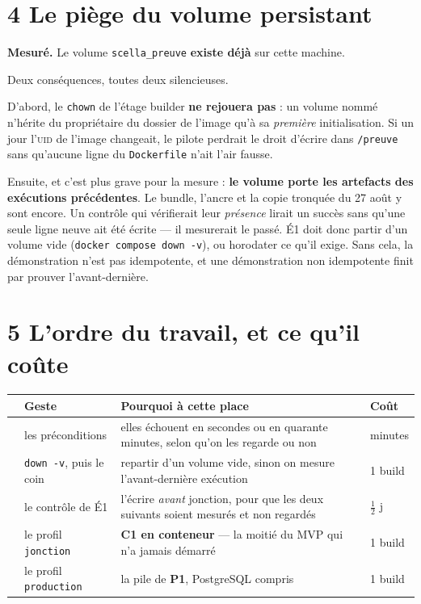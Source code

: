 \documentclass[11pt]{article}
\newcommand{\code}[1]{\texttt{\small #1}}
\newcommand{\mm}[1]{\textbf{#1}}
\newcommand{\sz}[1]{{\small #1}}
\newcommand{\mesure}[1]{{\color{efeteal}\textbf{Mesuré.} }#1\par}
\begin{document}
\section{4 \;\textbar\; Le piège du volume persistant}

\mesure{Le volume \code{scella\_preuve} \textbf{existe déjà} sur cette machine.}

Deux conséquences, toutes deux silencieuses.

D'abord, le \code{chown} de l'étage builder \textbf{ne rejouera pas} : un volume nommé n'hérite du
propriétaire du dossier de l'image qu'à sa \emph{première} initialisation. Si un jour l'\textsc{uid}
de l'image changeait, le pilote perdrait le droit d'écrire dans \code{/preuve} sans qu'aucune ligne
du \code{Dockerfile} n'ait l'air fausse.

Ensuite, et c'est plus grave pour la mesure : \textbf{le volume porte les artefacts des exécutions
précédentes}. Le bundle, l'ancre et la copie tronquée du 27 août y sont encore. Un contrôle qui
vérifierait leur \emph{présence} lirait un succès sans qu'une seule ligne neuve ait été écrite ---
il mesurerait le passé. \mbox{É1} doit donc partir d'un volume vide (\code{docker compose down -v}),
ou horodater ce qu'il exige. Sans cela, la démonstration n'est pas idempotente, et une démonstration
non idempotente finit par prouver l'avant-dernière.

\section{5 \;\textbar\; L'ordre du travail, et ce qu'il coûte}

\begin{center}\small
\renewcommand{\arraystretch}{1.3}
\begin{tabular}{@{}>{\raggedright\arraybackslash}p{0.8cm} >{\raggedright\arraybackslash}p{4.6cm} >{\raggedright\arraybackslash}p{8.0cm} >{\raggedright\arraybackslash}p{2.0cm}@{}}
\toprule
& \textbf{Geste} & \textbf{Pourquoi à cette place} & \textbf{Coût} \\
\midrule
1 & les préconditions & elles échouent en secondes ou en quarante minutes, selon qu'on les regarde ou non & \sz{minutes} \\
2 & \code{down -v}, puis le coin & repartir d'un volume vide, sinon on mesure l'avant-dernière exécution & \sz{1 build} \\
3 & le contrôle de \mbox{É1} & l'écrire \emph{avant} jonction, pour que les deux suivants soient mesurés et non regardés & \sz{$\frac{1}{2}$ j} \\
4 & le profil \code{jonction} & \textbf{C1 en conteneur} --- la moitié du MVP qui n'a jamais démarré & \sz{1 build} \\
5 & le profil \code{production} & la pile de \mm{P1}, PostgreSQL compris & \sz{1 build} \\
\bottomrule
\end{tabular}
\end{center}
\end{document}
